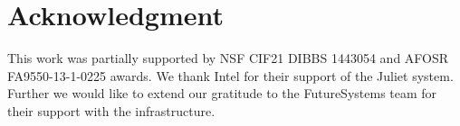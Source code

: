 \documentclass[10pt, conference, compsocconf]{IEEEtran}
\begin{document}
\section*{Acknowledgment}
This work was partially supported by NSF CIF21 DIBBS 1443054 and AFOSR FA9550-13-1-0225 awards. We thank Intel  for their support of the Juliet system. Further we would like to extend our gratitude to the FutureSystems team for their support with the infrastructure. 



%
%
%


% 


{}



\end{document}

